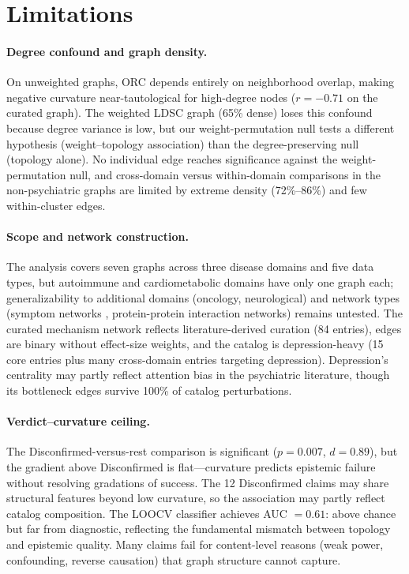 \documentclass[11pt]{article}
\begin{document}
\section{Limitations}
\label{sec:limitations}

\paragraph{Degree confound and graph density.} On unweighted graphs, ORC depends entirely on neighborhood overlap, making negative curvature near-tautological for high-degree nodes ($r = -0.71$ on the curated graph). The weighted LDSC graph (65\% dense) loses this confound because degree variance is low, but our weight-permutation null tests a different hypothesis (weight--topology association) than the degree-preserving null (topology alone). No individual edge reaches significance against the weight-permutation null, and cross-domain versus within-domain comparisons in the non-psychiatric graphs are limited by extreme density (72\%--86\%) and few within-cluster edges.

\paragraph{Scope and network construction.} The analysis covers seven graphs across three disease domains and five data types, but autoimmune and cardiometabolic domains have only one graph each; generalizability to additional domains (oncology, neurological) and network types (symptom networks \citep{borsboom2021network}, protein-protein interaction networks) remains untested. The curated mechanism network reflects literature-derived curation (84 entries), edges are binary without effect-size weights, and the catalog is depression-heavy (15 core entries plus many cross-domain entries targeting depression). Depression's centrality may partly reflect attention bias in the psychiatric literature, though its bottleneck edges survive 100\% of catalog perturbations.

\paragraph{Verdict--curvature ceiling.} The Disconfirmed-versus-rest comparison is significant ($p = 0.007$, $d = 0.89$), but the gradient above Disconfirmed is flat---curvature predicts epistemic failure without resolving gradations of success. The 12 Disconfirmed claims may share structural features beyond low curvature, so the association may partly reflect catalog composition. The LOOCV classifier achieves AUC $= 0.61$: above chance but far from diagnostic, reflecting the fundamental mismatch between topology and epistemic quality. Many claims fail for content-level reasons (weak power, confounding, reverse causation) that graph structure cannot capture.
\end{document}
